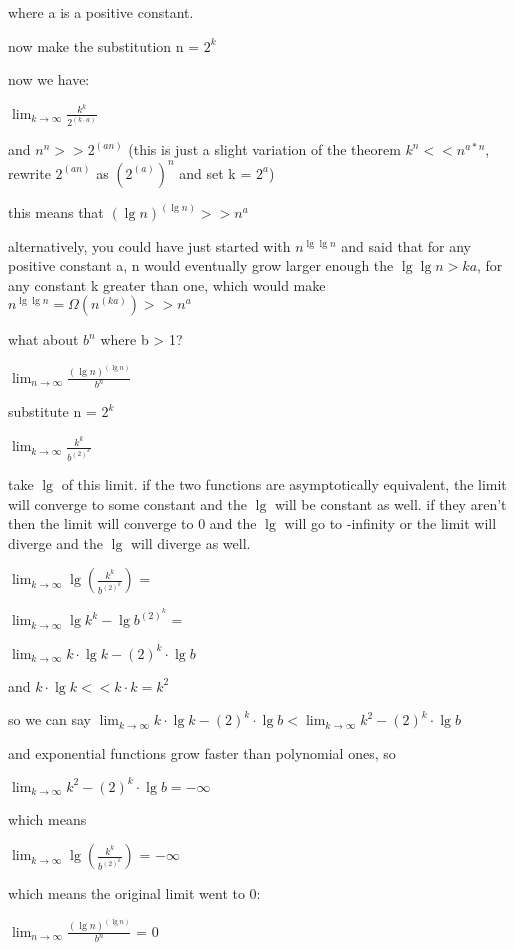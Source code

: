 \documentclass[11pt,fleqn]{article}
\theoremstyle{definition}
\theoremstyle{remark}
\begin{document}
where a is a positive constant.

now make the substitution n = $2^k$

now we have:

$\lim_{k \to \infty} \frac{{{k}^{k}}}{2^{(k \cdot a)}}$

and $n^n >> 2^{(an)}$ (this is just a slight variation of the theorem $k^{n} << n^{a*n}$,
rewrite $2^{(an)}$ as ${(2^{(a)})}^n$ and set k = $2^a$)

this means that ${(\lg n)}^{(\lg n)} >> n^a$

alternatively, you could have just started with $n^{\lg \lg n}$ and said that 
for any positive constant a, n would eventually grow larger enough the $\lg \lg n > ka$,
for any constant k greater than one, which would make $n^{\lg \lg n} = \Omega(n^{(ka)}) >> n^a$

what about $b^n$ where b > 1?

$\lim_{n \to \infty} \frac{{{(\lg n)}^{(\lg n)}}}{b^n}$

substitute n = $2^k$

$\lim_{k \to \infty} \frac{{k}^{k}}{b^{{(2)}^k}}$

take $\lg$ of this limit. if the two functions are asymptotically equivalent, the 
limit will converge to some constant and the $\lg$ will be constant as well.
if they aren't then the limit will converge to 0 and the $\lg$ will go to -infinity
or the limit will diverge and the $\lg$ will diverge as well.

$\lim_{k \to \infty} \lg \left(\frac{{k}^{k}}{b^{{(2)}^k}}\right)$ = 

$\lim_{k \to \infty} \lg {k}^{k} - \lg {b^{{(2)}^k}}$ =

$\lim_{k \to \infty} k \cdot \lg {k} - {(2)}^k \cdot \lg {b}$ 

and $k \cdot \lg {k} << k \cdot k = k^2$

so we can say $\lim_{k \to \infty} k \cdot \lg {k} - {(2)}^k \cdot \lg {b} < \lim_{k \to \infty} k^2 - {(2)}^k \cdot \lg {b}$ 

and exponential functions grow faster than polynomial ones, so 

$\lim_{k \to \infty} k^2 - {(2)}^k \cdot \lg {b} = -\infty $

which means

$\lim_{k \to \infty} \lg \left(\frac{{k}^{k}}{b^{{(2)}^k}}\right)$ = $-\infty$

which means the original limit went to 0:

$\lim_{n \to \infty} \frac{{{(\lg n)}^{(\lg n)}}}{b^n}$ = 0
\end{document}
